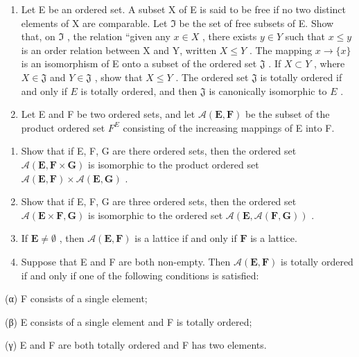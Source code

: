 \begin{enumerate}
\def\labelenumi{\arabic{enumi}.}
\setcounter{enumi}{4}
\item
  Let E be an ordered set. A subset X of E is said to be free if no two distinct elements of X are comparable. Let \(\Im\) be the set of free subsets of E. Show that, on \(\Im\) , the relation ``given any \(x \in X\) , there exists \(y \in Y\) such that \(x \leqslant y\) is an order relation between X and Y, written \(X \leqslant Y\) . The mapping \(x \to \{x\}\) is an isomorphism of E onto a subset of the ordered set \(\mathfrak{J}\) . If \(X \subset Y\) , where \(X \in \mathfrak{J}\) and \(Y \in \mathfrak{J}\) , show that \(X \leqslant Y\) . The ordered set \(\mathfrak{J}\) is totally ordered if and only if \(E\) is totally ordered, and then \(\mathfrak{J}\) is canonically isomorphic to \(E\) .
\item
  Let E and F be two ordered sets, and let \(\mathcal{A}(\mathbf{E},\mathbf{F})\) be the subset of the product ordered set \(F^{E}\) consisting of the increasing mappings of E into F.
\end{enumerate}

\begin{enumerate}
\def\labelenumi{(\alph{enumi})}
\item
  Show that if E, F, G are there ordered sets, then the ordered set \(\mathcal{A}(\mathbf{E}, \mathbf{F} \times \mathbf{G})\) is isomorphic to the product ordered set \(\mathcal{A}(\mathbf{E}, \mathbf{F}) \times \mathcal{A}(\mathbf{E}, \mathbf{G})\) .
\item
  Show that if E, F, G are three ordered sets, then the ordered set \(\mathcal{A}(\mathbf{E} \times \mathbf{F}, \mathbf{G})\) is isomorphic to the ordered set \(\mathcal{A}(\mathbf{E}, \mathcal{A}(\mathbf{F}, \mathbf{G}))\) .
\item
  If \(\mathbf{E} \neq \emptyset\) , then \(\mathcal{A}(\mathbf{E}, \mathbf{F})\) is a lattice if and only if \(\mathbf{F}\) is a lattice.
\item
  Suppose that E and F are both non-empty. Then \(\mathcal{A}(\mathbf{E}, \mathbf{F})\) is totally ordered if and only if one of the following conditions is satisfied:
\end{enumerate}

(α) F consists of a single element;

(β) E consists of a single element and F is totally ordered;

(γ) E and F are both totally ordered and F has two elements.

